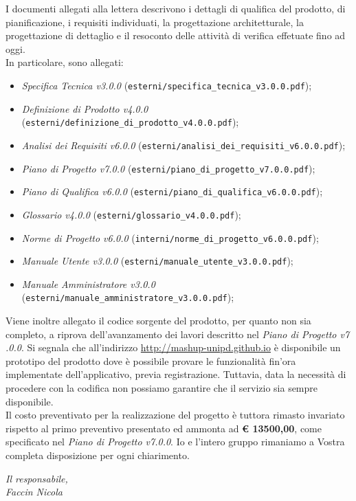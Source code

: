 \documentclass[10pt,a4paper,sans]{moderncv}        %
\begin{document}
\vfill
I documenti allegati alla lettera descrivono i dettagli di qualifica del prodotto, di pianificazione, i requisiti individuati, la progettazione architetturale, la progettazione di dettaglio e il resoconto delle attività di verifica effetuate fino ad oggi.\\
\vfill
In particolare, sono allegati:
	\begin{itemize}
		\item \textit{Specifica Tecnica v3.0.0} ({\verb!esterni/specifica_tecnica_v3.0.0.pdf!});
		\item \textit{Definizione di Prodotto v4.0.0} ({\verb!esterni/definizione_di_prodotto_v4.0.0.pdf!});
		\item \textit{Analisi dei Requisiti v6.0.0} ({\verb!esterni/analisi_dei_requisiti_v6.0.0.pdf!});
		\item \textit{Piano di Progetto v7.0.0} ({\verb!esterni/piano_di_progetto_v7.0.0.pdf!});
		\item \textit{Piano di Qualifica v6.0.0} ({\verb!esterni/piano_di_qualifica_v6.0.0.pdf!});
		\item \textit{Glossario v4.0.0} ({\verb!esterni/glossario_v4.0.0.pdf!});
		\item \textit{Norme di Progetto v6.0.0} ({\verb!interni/norme_di_progetto_v6.0.0.pdf!});
		\item \textit{Manuale Utente v3.0.0} ({\verb!esterni/manuale_utente_v3.0.0.pdf!});
		\item \textit{Manuale Amministratore v3.0.0} ({\verb!esterni/manuale_amministratore_v3.0.0.pdf!});
	\end{itemize}
\noindent
Viene inoltre allegato il codice sorgente del prodotto, per quanto non sia completo, a riprova dell'avanzamento dei lavori descritto nel \textit{Piano di Progetto v7	.0.0}. Si segnala che all'indirizzo {\color{blue}\url{http://mashup-unipd.github.io}} è disponibile un prototipo del prodotto dove è possibile provare le funzionalità fin'ora implementate dell'applicativo, previa registrazione. Tuttavia, data la necessità di procedere con la codifica non possiamo garantire che il servizio sia sempre disponibile.\\
\vfill
Il costo preventivato per la realizzazione del progetto è tuttora rimasto invariato rispetto al primo preventivo presentato ed ammonta ad \textbf{\euro{} 13500,00}, come specificato nel \textit{Piano di Progetto v7.0.0}. \newline Io e l'intero gruppo rimaniamo a Vostra completa disposizione per ogni chiarimento.
	\begin{flushright}
		\textit{Il responsabile,}\\
		\textit{Faccin Nicola}
	\end{flushright}
\end{document}
